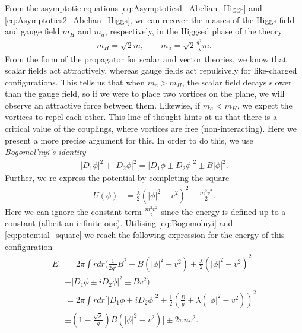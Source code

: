     From the asymptotic equations \eqref{eq:Asymptotics1_Abelian_Higgs} and \eqref{eq:Asymptotics2_Abelian_Higgs}, we can recover the masses of the Higgs field and gauge field $m_{H}$ and $m_a$, respectively, in the Higgsed phase of the theory 
    \begin{align}
        m_{H}= \sqrt{2} m, \qquad m_a = \sqrt{2} \frac{g^2}{\lambda}m .
    \end{align}
    From the form of the propagator for scalar and vector theories, we know that scalar fields act attractively, whereas gauge fields act repulsively for like-charged configurations. This tells us that when $m_a>m_H$, the scalar field decays slower than the gauge field, so if we were to place two vortices on the plane, we will observe an attractive force between them. Likewise, if  $m_a<m_H$, we expect the vortices to repel each other. This line of thought hints at us that there is a critical value of the couplings, where vortices are free (non-interacting). Here we present a more precise argument for this. In order to do this, we use \textit{Bogomol'nyi's identity}
    \begin{align}
        |D_1 \phi|^2 + |D_2 \phi|^2 = |D_1 \phi \pm D_2 \phi|^2 \pm B |\phi|^2. \label{eq:Bogomolnyi}
    \end{align}
    Further, we re-express the potential by completing the square
    \begin{align}
        U(\phi)&=\frac{\lambda}{2} \left( |\phi|^2 - v^2 \right)^2 - \frac{m^2 v^2}{2}. \label{eq:potential_square}
    \end{align}
    Here we can ignore the constant term $\frac{m^2 v^2}{2}$ since the energy is defined up to a constant (albeit an infinite one). Utilising \eqref{eq:Bogomolnyi} and \eqref{eq:potential_square} we reach the following expression for the energy of this configuration
    \begin{align}
        E &= 2 \pi \int r dr \bigg(\frac{1}{2 g^2}B^2 \pm B(|\phi|^2 -v^2) + \frac{\lambda}{2} \left(|\phi|^2 -v^2 \right)^2  \nonumber \\
        &+ |D_1\phi \pm i D_2 \phi|^2 \pm B v^2 \bigg) \label{eq:BPS_Energy_Higgs_Vortex_Background1}\\ 
        &= 2 \pi \int r dr \bigg[|D_1\phi \pm i D_2 \phi|^2 +\frac{1}{2}\left( \frac{B}{g} \pm \lambda \left(|\phi|^2 -v^2  \right) \right)^2   \nonumber\\ 
        &\pm \left(1 - \frac{\sqrt{\lambda}}{g} \right) B \left(|\phi|^2 - v^2 \right) \bigg] \pm 2\pi n v^2. \label{eq:BPS_Energy_Higgs_Vortex_Background2}
    \end{align}
